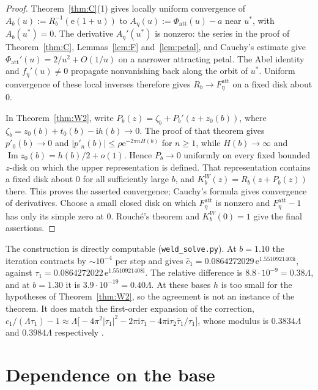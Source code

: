 \documentclass[11pt]{amsart}
\theoremstyle{definition}
\newcommand{\Rr}{R}
\newcommand{\Kk}{K}
\newcommand{\eee}{\mathrm{e}}
\newcommand{\ii}{\mathrm{i}}
\begin{document}
\begin{proof}
Theorem~\ref{thm:C}(1) gives locally uniform convergence of
$A_b(u):=\Rr_b^{-1}(\eee(1+u))$ to
$A_\eta(u):=\Phi_{\mathrm{att}}(u)-a$ near $u^*$, with $A_b(u^*)=0$.
The derivative $A_\eta'(u^*)$ is nonzero: the series in the proof of
Theorem~\ref{thm:C}, Lemmas~\ref{lem:F} and~\ref{lem:petal}, and Cauchy's
estimate give $\Phi_{\mathrm{att}}'(u)=2/u^2+O(1/u)$ on a narrower
attracting petal.  The Abel identity and $f_\eta'(u)\ne0$ propagate
nonvanishing back along the orbit of $u^*$.  Uniform
convergence of these local inverses therefore gives
$\Rr_b\to F_\eta^{\mathrm{att}}$ on a fixed disk about $0$.

In Theorem~\ref{thm:W2}, write
$P_b(z)=\zeta_b+P_b'(z+z_0(b))$, where
$\zeta_b=z_0(b)+t_0(b)-\ii h(b)\to0$.  The proof of that theorem gives
$p'_0(b)\to0$ and $|p'_n(b)|\le\rho\eee^{-2\pi nH(b)}$ for $n\ge1$,
while $H(b)\to\infty$ and $\operatorname{Im}z_0(b)=h(b)/2+o(1)$.
Hence $P_b\to0$ uniformly on every fixed bounded $z$-disk on which
the upper representation is defined.  That representation contains a
fixed disk about $0$ for all sufficiently large $b$, and
$\Kk_b^W(z)=\Rr_b(z+P_b(z))$ there.  This proves the asserted convergence;
Cauchy's formula gives convergence of derivatives.  Choose a small
closed disk on which $F_\eta^{\mathrm{att}}$ is nonzero and
$F_\eta^{\mathrm{att}}-1$ has only its simple zero at $0$.
Rouch\'e's theorem and $\Kk_b^W(0)=1$ give the final assertions.
\end{proof}

\noindent
The construction is directly computable (\texttt{weld\_solve.py}).  At
$b=1.10$ the iteration contracts by $\sim10^{-4}$ per step and gives
$\hat c_1=0.0864272029\,\eee^{1.5510921403\ii}$, against
$\tau_1=0.0864272022\,\eee^{1.5510921408\ii}$.  The relative difference is
$8.8\cdot10^{-9}=0.38\Lambda$, and at $b=1.30$ it is $3.9\cdot10^{-19}=0.40\Lambda$.
At these bases $h$ is too small for the hypotheses of Theorem~\ref{thm:W2}, so
the agreement is not an instance of the theorem.  It does match the first-order
expansion of the correction,
$c_1/(\Lambda\tau_1)-1\approx\Lambda\bigl[-4\pi^2|\tau_1|^2-2\pi\ii\tau_1
-4\pi\ii\tau_2\bar\tau_1/\tau_1\bigr]$, whose modulus is $0.3834\Lambda$ and
$0.3984\Lambda$ respectively .

\section{Dependence on the base}\label{sec:W1}
\end{document}
